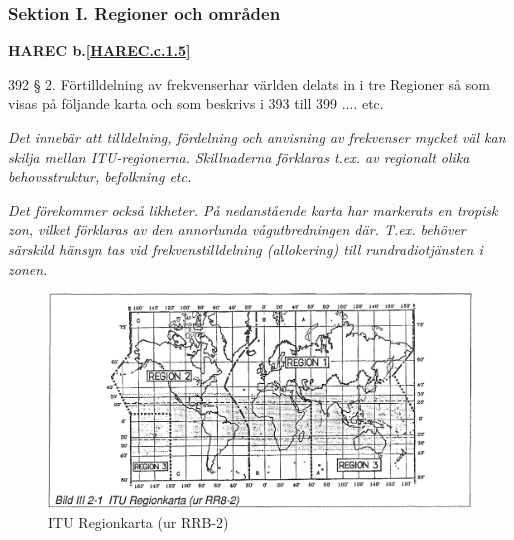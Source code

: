 \subsubsection{Sektion I. Regioner och områden}
\textbf{
HAREC b.\ref{HAREC.c.1.5}\label{myHAREC.c.1.5}
}

392 § 2. Förtilldelning av frekvenserhar världen delats in i tre
Regioner så som visas på följande karta och som beskrivs i 393 till
399 .... etc.

\emph{ Det innebär att tilldelning, fördelning och anvisning av
  frekvenser mycket väl kan skilja mellan ITU-regionerna. Skillnaderna
  förklaras t.ex. av regionalt olika behovsstruktur, befolkning etc.}

\emph{Det förekommer också likheter. På nedanstående karta har
  markerats en tropisk zon, vilket förklaras av den annorlunda
  vågutbredningen där. T.ex. behöver särskild hänsyn tas vid
  frekvenstilldelning (allokering) till rundradiotjänsten i zonen.}

\begin{figure}
  \includegraphics[width=\textwidth]{images/bild_3_2-01}
  \caption{ITU Regionkarta (ur RRB-2)}
  \label{fig:bildIII2-1}
\end{figure}
